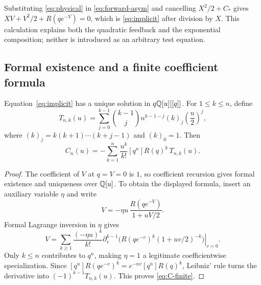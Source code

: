 Substituting \eqref{eq:physical} in \eqref{eq:forward-asym} and cancelling
$X^2/2+C_*$ gives
$XV+V^2/2+R(qe^{-V})=0$, which is \eqref{eq:implicit} after division by $X$.
This calculation explains both the quadratic feedback and the exponential
composition; neither is introduced as an arbitrary test equation.

\subsection{Formal existence and a finite coefficient formula}

\begin{proposition}\label{prop:lagrange}
Equation~\eqref{eq:implicit} has a unique solution in $q\mathbb Q[u][[q]]$.
For $1\le k\le n$, define
\begin{equation}\label{eq:T}
 T_{n,k}(u)=\sum_{j=0}^{k-1}\binom{k-1}{j}
      n^{k-1-j}(k)_j\left(\frac u2\right)^j,
\end{equation}
where $(k)_j=k(k+1)\cdots(k+j-1)$ and $(k)_0=1$. Then
\begin{equation}\label{eq:C-finite}
 C_n(u)=-\sum_{k=1}^{n}\frac{u^k}{k!}[q^n]R(q)^k\,T_{n,k}(u).
\end{equation}
\end{proposition}
\begin{proof}
The coefficient of $V$ at $q=V=0$ is $1$, so coefficient recursion gives
formal existence and uniqueness over $\mathbb Q[u]$. To obtain the displayed
formula, insert an auxiliary variable $\eta$ and write
\[
 V=-\eta u\,\frac{R(qe^{-V})}{1+uV/2}.
\]
Formal Lagrange inversion in $\eta$ gives
\[
 V=\sum_{k\ge1}\frac{(-\eta u)^k}{k!}
 \left.\partial_v^{k-1}
 \bigl(R(qe^{-v})^k(1+uv/2)^{-k}\bigr)\right|_{v=0}.
\]
Only $k\le n$ contributes to $q^n$, making $\eta=1$ a legitimate
coefficientwise specialization. Since
$[q^n]R(qe^{-v})^k=e^{-nv}[q^n]R(q)^k$, Leibniz' rule turns the derivative
into $(-1)^{k-1}T_{n,k}(u)$. This proves \eqref{eq:C-finite}.
\end{proof}

